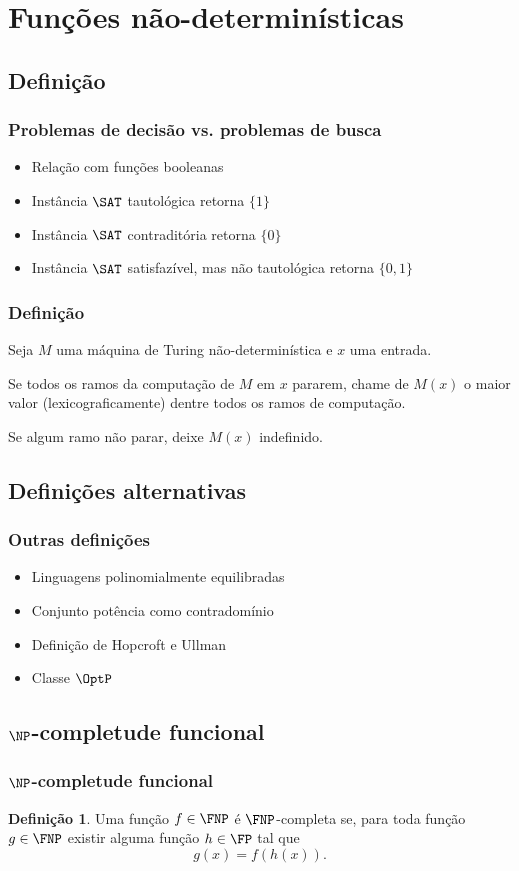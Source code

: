 \documentclass[utf8,notheorems]{beamer}
\theoremstyle{definition}
\newtheorem*{definition}{Definição}
\begin{document}
\section{Funções não-determinísticas}

\subsection{Definição}
\begin{frame}
    \frametitle{Problemas de decisão vs. problemas de busca}
    \begin{itemize}
        \item Relação com funções booleanas
        \item Instância $\SAT$ tautológica retorna $\{1\}$
        \item Instância $\SAT$ contraditória retorna $\{0\}$
        \item Instância $\SAT$ satisfazível, mas não tautológica retorna $\{0, 1\}$
    \end{itemize}
\end{frame}
\begin{frame}
    \frametitle{Definição}
    Seja $M$ uma máquina de Turing não-determinística
    e $x$ uma entrada.

    Se todos os ramos da computação de $M$ em $x$ pararem,
    chame de $M(x)$ o maior valor
    (lexicograficamente)
    dentre todos os ramos de computação.

    Se algum ramo não parar,
    deixe $M(x)$ indefinido.
\end{frame}

\subsection{Definições alternativas}
\begin{frame}
    \frametitle{Outras definições}
    \begin{itemize}
        \item Linguagens polinomialmente equilibradas
        \item Conjunto potência como contradomínio
        \item Definição de Hopcroft e Ullman
        \item Classe $\OptP$
    \end{itemize}
\end{frame}

\subsection{$\NP$-completude funcional}
\begin{frame}
    \frametitle{$\NP$-completude funcional}
    \begin{definition}
        Uma função $f \in \FNP$ é $\FNP$-completa se,
        para toda função $g \in \FNP$
        existir alguma função $h \in \FP$ tal que
        \begin{equation*}
            g(x) = f(h(x)).
        \end{equation*}
    \end{definition}
\end{frame}
\end{document}
